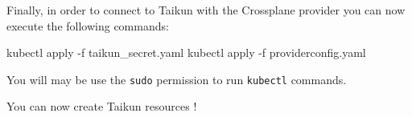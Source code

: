 Finally, in order to connect to Taikun with the Crossplane provider you can now execute the following commands:
\begin{shell}
kubectl apply -f taikun_secret.yaml
kubectl apply -f providerconfig.yaml
\end{shell}

\begin{note}
You will may be use the \texttt{sudo} permission to run \texttt{kubectl} commands.
\end{note}

You can now create Taikun resources !